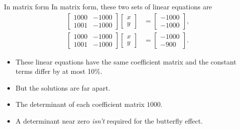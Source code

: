 \documentclass[usenames,dvipsnames,fleqn]{beamer}
\theoremstyle{definition}
\begin{document}
\begin{frame}{In matrix form}
In matrix form, these two sets of linear equations are
\begin{align*}
 \begin{bmatrix} 1000& -1000 \\ 1001 & -1000 \end{bmatrix} \begin{bmatrix} x \\ y \end{bmatrix} &= 
     \begin{bmatrix} -1000 \\ -1000 \end{bmatrix}, \\
 \begin{bmatrix} 1000 & -1000 \\ 1001 & -1000 \end{bmatrix} \begin{bmatrix} x \\ y \end{bmatrix} &= 
     \begin{bmatrix} -1000 \\ -900 \end{bmatrix}.   
\end{align*}

\begin{itemize}

\item These linear equations have the same coefficient matrix and the constant terms differ by at most 10\%.

\item But the solutions are far apart. 

\item The determinant of each coefficient matrix \(1000\).

\item A  determinant near zero \emph{isn't} required for the butterfly effect.



\end{itemize}
\end{frame}
\end{document}
